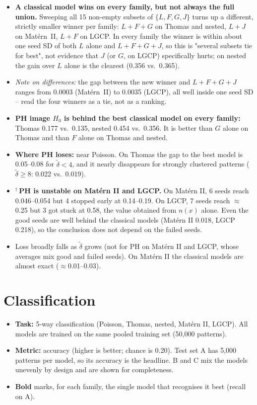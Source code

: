 \documentclass[10pt,a4paper]{article}
\newcommand{\dtil}{\tilde\delta}
\begin{document}
\begin{itemize}
  \item \textbf{A classical model wins on every family, but not always the full union.} Sweeping all 15 non-empty subsets of $\{L,F,G,J\}$ turns up a different, strictly smaller winner per family: $L{+}F{+}G$ on Thomas and nested, $L{+}J$ on Mat\'ern~II, $L{+}F$ on LGCP. In every family the winner is within about one seed SD of both $L$ alone and $L{+}F{+}G{+}J$, so this is "several subsets tie for best", not evidence that $J$ (or $G$, on LGCP) specifically hurts; on nested the gain over $L$ alone is the clearest (0.356 vs.\ 0.365).
  \item \textit{Note on differences:} the gap between the new winner and $L{+}F{+}G{+}J$ ranges from 0.0003 (Mat\'ern~II) to 0.0035 (LGCP), all well inside one seed SD -- read the four winners as a tie, not as a ranking.
  \item \textbf{PH image $H_0$ is behind the best classical model on every family:} Thomas 0.177 vs.\ 0.135, nested 0.454 vs.\ 0.356. It is better than $G$ alone on Thomas and than $F$ alone on Thomas and nested.
  \item \textbf{Where PH loses:} near Poisson. On Thomas the gap to the best model is 0.05--0.08 for $\dtil < 4$, and it nearly disappears for strongly clustered patterns ($\dtil \ge 8$: 0.022 vs.\ 0.019).
  \item $^\dagger$\,\textbf{PH is unstable on Mat\'ern II and LGCP.} On Mat\'ern II, 6 seeds reach 0.046--0.054 but 4 stopped early at 0.14--0.19. On LGCP, 7 seeds reach $\approx$0.25 but 3 got stuck at 0.58, the value obtained from $n(x)$ alone. Even the good seeds are well behind the classical models (Mat\'ern II 0.018, LGCP 0.218), so the conclusion does not depend on the failed seeds.
  \item Loss broadly falls as $\dtil$ grows (not for PH on Mat\'ern II and LGCP, whose averages mix good and failed seeds). On Mat\'ern II the classical models are almost exact ($\approx$0.01--0.03).
\end{itemize}

\section{Classification}

\begin{itemize}
  \item \textbf{Task:} 5-way classification (Poisson, Thomas, nested, Mat\'ern II, LGCP). All models are trained on the same pooled training set (50{,}000 patterns).
  \item \textbf{Metric:} accuracy (higher is better; chance is 0.20). Test set A has 5{,}000 patterns per model, so its accuracy is the headline. B and C mix the models unevenly by design and are shown for completeness.
  \item \textbf{Bold} marks, for each family, the single model that recognises it best (recall on A).
\end{itemize}
\end{document}
